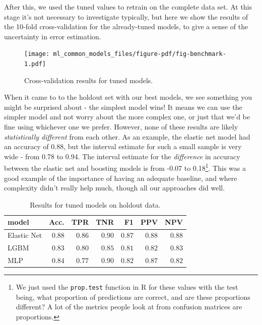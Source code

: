 \documentclass[
  letterpaper,
]{krantz}
\begin{document}
After this, we used the tuned values to retrain on the complete data
set. At this stage it's not necessary to investigate typically, but here
we show the results of the 10-fold cross-validation for the
already-tuned models, to give a sense of the uncertainty in error
estimation.

\begin{figure}

{\centering \texttt{[image: ml\_common\_models\_files/figure-pdf/fig-benchmark-1.pdf]}

}

\caption{\label{fig-benchmark}Cross-validation results for tuned
models.}

\end{figure}

When it came to to the holdout set with our best models, we see
something you might be surprised about - the simplest model wins! It
means we can use the simpler model and not worry about the more complex
one, or just that we'd be fine using whichever one we prefer. However,
none of these results are likely \emph{statistically different} from
each other. As an example, the elastic net model had an accuracy of
0.88, but the interval estimate for such a small sample is very wide -
from 0.78 to 0.94. The interval estimate for the \emph{difference} in
accuracy between the elastic net and boosting models is from -0.07 to
0.18\footnote{We just used the \texttt{prop.test} function in R for
  these values with the test being, what proportion of predictions are
  correct, and are these proportions different? A lot of the metrics
  people look at from confusion matrices are proportions.}. This was a
good example of the importance of having an adequate baseline, and where
complexity didn't really help much, though all our approaches did well.

\hypertarget{tbl-benchmark-r}{}
\begin{longtable}{lrrrrrr}
\caption{\label{tbl-benchmark-r}Results for tuned models on holdout data. }\tabularnewline

\toprule
model & Acc. & TPR & TNR & F1 & PPV & NPV \\ 
\midrule\addlinespace[2.5pt]
Elastic Net & \textcolor[HTML]{404040}{$0.88$} & \textcolor[HTML]{404040}{$0.86$} & \textcolor[HTML]{404040}{$0.90$} & \textcolor[HTML]{404040}{$0.87$} & \textcolor[HTML]{404040}{$0.88$} & \textcolor[HTML]{404040}{$0.88$} \\ 
LGBM & \textcolor[HTML]{404040}{$0.83$} & \textcolor[HTML]{404040}{$0.80$} & \textcolor[HTML]{404040}{$0.85$} & \textcolor[HTML]{404040}{$0.81$} & \textcolor[HTML]{404040}{$0.82$} & \textcolor[HTML]{404040}{$0.83$} \\ 
MLP & \textcolor[HTML]{404040}{$0.84$} & \textcolor[HTML]{404040}{$0.77$} & \textcolor[HTML]{404040}{$0.90$} & \textcolor[HTML]{404040}{$0.82$} & \textcolor[HTML]{404040}{$0.87$} & \textcolor[HTML]{404040}{$0.82$} \\ 
\bottomrule
\end{longtable}
\end{document}
